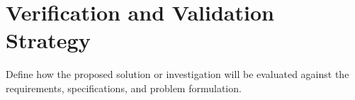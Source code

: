 \section{Verification and Validation Strategy}
Define how the proposed solution or investigation 
will be evaluated against the requirements, specifications, 
and problem formulation. 